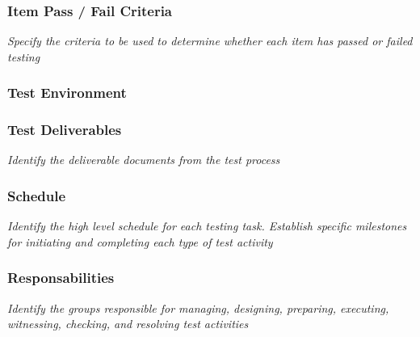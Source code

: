 \begin{appendices}
\subsubsection{Item Pass / Fail Criteria}
\textit{Specify the criteria to be used to determine whether each item has passed or failed testing}
\subsubsection{Test Environment}
\subsubsection{Test Deliverables}
\textit{Identify the deliverable documents from the test process}
\subsubsection{Schedule}
\textit{Identify the high level schedule for each testing task. Establish specific milestones for initiating and completing each type of test activity}
\subsubsection{Responsabilities}
\textit{Identify the groups responsible for managing, designing, preparing, executing, witnessing, checking, and resolving test activities}

\newpage

\end{appendices}
